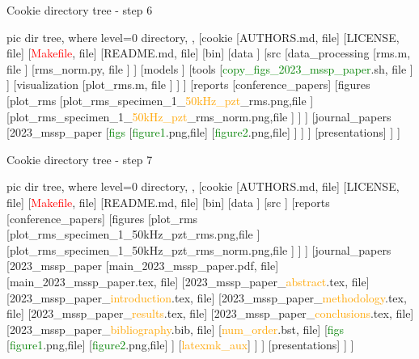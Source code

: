 \documentclass[10pt,aspectratio=169]{beamer} %
\begin{document}
\begin{frame}[t]{Cookie directory tree - step 6}
\centering
	\begin{forest}
		pic dir tree,
		where level=0{}{%
			directory,
		},
		[cookie
		[AUTHORS.md, file]
		[LICENSE, file]
		[\textcolor{red}{Makefile}, file]
		[README.md, file]
		[bin]
		[data
		]
		[src
			[data\_processing
				[rms.m, file
				]
				[rms\_norm.py, file
				]
			]
			[models
			]
			[tools
				[\textcolor{green}{copy\_figs\_2023\_mssp\_paper}.sh, file
				]
			]
			[visualization
				[plot\_rms.m, file
				]
			]
		]
		[reports
			[conference\_papers]	
			[figures
				[plot\_rms
					[\textcolor{logoblue}{plot\_rms}\_specimen\_1\_\textcolor{orange}{50kHz\_pzt}\_\alert{rms}.png,file
					]
					[\textcolor{logoblue}{plot\_rms}\_specimen\_1\_\textcolor{orange}{50kHz\_pzt}\_\alert{rms\_norm}.png,file
					]
				]
			]
			[journal\_papers
				[2023\_mssp\_paper
					[\textcolor{green}{figs}
						[\textcolor{green}{figure1}.png,file]
						[\textcolor{green}{figure2}.png,file]
					]
				]
			]
			[presentations]
		]
		]
	\end{forest}
\end{frame}
\begin{frame}[t]{Cookie directory tree - step 7}
\centering
	\begin{forest}
		pic dir tree,
		where level=0{}{%
			directory,
		},
		[cookie
		[AUTHORS.md, file]
		[LICENSE, file]
		[\textcolor{red}{Makefile}, file]
		[README.md, file]
		[bin]
		[data
		]
		[src
		]
		[reports
			[conference\_papers]	
			[figures
				[plot\_rms
					[plot\_rms\_specimen\_1\_50kHz\_pzt\_rms.png,file
					]
					[plot\_rms\_specimen\_1\_50kHz\_pzt\_rms\_norm.png,file
					]
				]
			]
			[journal\_papers
				[\alert{2023\_mssp\_paper}
					[\textcolor{logoblue}{main}\_\alert{2023\_mssp\_paper}.pdf, file]
					[\textcolor{logoblue}{main}\_\alert{2023\_mssp\_paper}.tex, file]
					[\alert{2023\_mssp\_paper}\_\textcolor{orange}{abstract}.tex, file]
					[\alert{2023\_mssp\_paper}\_\textcolor{orange}{introduction}.tex, file]
					[\alert{2023\_mssp\_paper}\_\textcolor{orange}{methodology}.tex, file]
					[\alert{2023\_mssp\_paper}\_\textcolor{orange}{results}.tex, file]
					[\alert{2023\_mssp\_paper}\_\textcolor{orange}{conclusions}.tex, file]
					[\alert{2023\_mssp\_paper}\_\textcolor{orange}{bibliography}.bib, file]
					[\textcolor{orange}{num\_order}.bst, file]
					[\textcolor{green}{figs}
						[\textcolor{green}{figure1}.png,file]
						[\textcolor{green}{figure2}.png,file]
					]
					[\textcolor{orange}{latexmk\_aux}]
				]
			]
			[presentations]
		]
		]
	\end{forest}
\end{frame}
\end{document}
